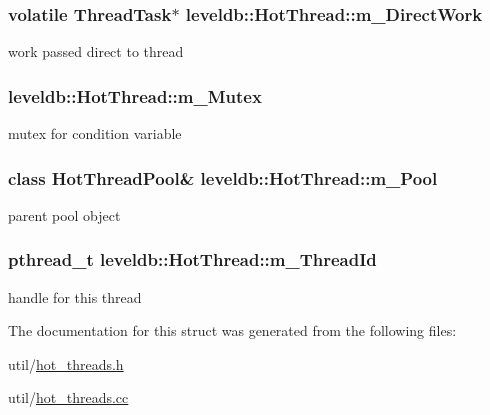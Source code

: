 \subsubsection[{m\+\_\+\+Direct\+Work}]{\setlength{\rightskip}{0pt plus 5cm}volatile {\bf Thread\+Task}$\ast$ leveldb\+::\+Hot\+Thread\+::m\+\_\+\+Direct\+Work}\label{structleveldb_1_1_hot_thread_a18e771cb85ee461a0a790ee5a405f1e7}


work passed direct to thread 

\hypertarget{structleveldb_1_1_hot_thread_a26f6be5d8a8b888eef2ebae5a382c854}{}
\subsubsection[{m\+\_\+\+Mutex}]{ leveldb\+::\+Hot\+Thread\+::m\+\_\+\+Mutex}\label{structleveldb_1_1_hot_thread_a26f6be5d8a8b888eef2ebae5a382c854}


mutex for condition variable 

\hypertarget{structleveldb_1_1_hot_thread_ab42a98dcba66173c32c6b47ec3cabb4e}{}
\subsubsection[{m\+\_\+\+Pool}]{\setlength{\rightskip}{0pt plus 5cm}class {\bf Hot\+Thread\+Pool}\& leveldb\+::\+Hot\+Thread\+::m\+\_\+\+Pool}\label{structleveldb_1_1_hot_thread_ab42a98dcba66173c32c6b47ec3cabb4e}


parent pool object 

\hypertarget{structleveldb_1_1_hot_thread_a9c05159cb466d0681f8c068fd92b4cb3}{}
\subsubsection[{m\+\_\+\+Thread\+Id}]{\setlength{\rightskip}{0pt plus 5cm}pthread\+\_\+t leveldb\+::\+Hot\+Thread\+::m\+\_\+\+Thread\+Id}\label{structleveldb_1_1_hot_thread_a9c05159cb466d0681f8c068fd92b4cb3}


handle for this thread 



The documentation for this struct was generated from the following files\+:\begin{DoxyCompactItemize}
\item 
util/\hyperlink{hot__threads_8h}{hot\+\_\+threads.\+h}\item 
util/\hyperlink{hot__threads_8cc}{hot\+\_\+threads.\+cc}\end{DoxyCompactItemize}
